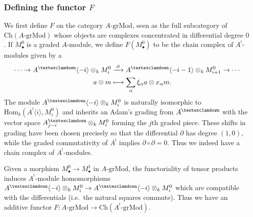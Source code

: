 \documentclass[a4paper]{article}
\theoremstyle{definition}
\theoremstyle{remark}
\newcommand{\grMod}{\ensuremath{\text{-grMod}}}
\newcommand{\Ch}{\ensuremath{\text{Ch}}}
\newcommand{\Hom}{\ensuremath{\text{Hom}}}
\newcommand{\gnab}{{\textexclamdown}}
\begin{document}
\subsubsection{Defining the functor \(F\)} 
We first define \(F\) on the category \(A\grMod\), seen as the full subcategory of
\(\Ch(A\grMod)\) whose objects are complexes concentrated in differential degree
\(0\). If \(M^0_\bullet\) is a graded \(A\)-module, we define \(F(M^0_\bullet)\)
to be the chain complex of \(A^!\)-modules given by a
\begin{align*} 
    \cdots \rightarrow A^\gnab\langle -i \rangle \otimes_k M^0_i
    &\xrightarrow{\;\partial\;} A^\gnab \langle -i-1 \rangle \otimes_k
    M^0_{i+1} \rightarrow \cdots \\ 
    a\otimes m &\longmapsto \sum_\alpha \xi_\alpha a \otimes x_\alpha m.  
\end{align*} 
The module \(A^\gnab\langle -i \rangle \otimes_k M^0_i\) is naturally
isomorphic to \(\Hom_k(A^!\langle i \rangle, M^0_i)\) and inherits an Adam's
grading from \(A^\gnab\) with the vector space \(A^\gnab_{j-i}\otimes_k M^0_i\)
forming the \(j\)th graded piece. These shifts in grading have been chosen
precisely so that the differential \(\partial\) has degree \((1,0)\),  while
the graded commutativity of \(A^!\) implies \(\partial\circ \partial=0\).
Thus we indeed have a chain complex of \(A^!\)-modules. 

Given a morphism \(M^0_\bullet \rightarrow M^1_\bullet\) in \(A\grMod\),
the functoriality of tensor products induces \(A^!\)-module
homomorphisms \(A^\gnab\langle-i \rangle \otimes_k M^0_i \rightarrow
A^\gnab\langle-i\rangle \otimes_k M^0_i\) which are compatible with the
differentials (i.e.\ the natural squares commute). Thus we have an additive functor
\({F:A\grMod\rightarrow \Ch(A^!\grMod)}\).
\end{document}
